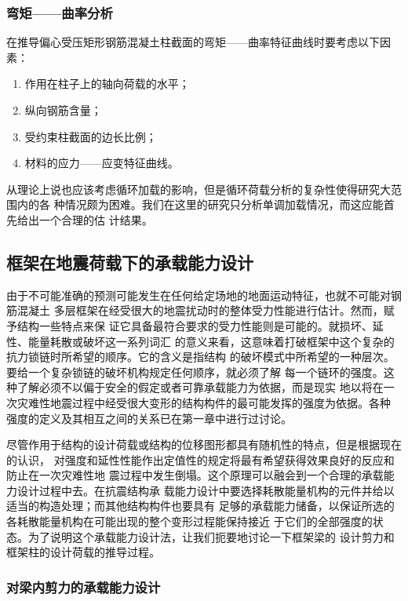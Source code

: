 \documentclass[12pt,a4paper]{book}
\begin{document}
\subsubsection{弯矩——曲率分析}

在推导偏心受压矩形钢筋混凝土柱截面的弯矩——曲率特征曲线时要考虑以下因素：
\begin{enumerate}
\item 作用在柱子上的轴向荷载的水平；
\item 纵向钢筋含量；
\item 受约束柱截面的边长比例；
\item 材料的应力——应变特征曲线。
\end{enumerate}

从理论上说也应该考虑循环加载的影响，但是循环荷载分析的复杂性使得研究大范围内的各
种情况颇为困难。我们在这里的研究只分析单调加载情况，而这应能首先给出一个合理的估
计结果。

\subsection{框架在地震荷载下的承载能力设计}

由于不可能准确的预测可能发生在任何给定场地的地面运动特征，也就不可能对钢筋混凝土
多层框架在经受很大的地震扰动时的整体受力性能进行估计。然而，赋予结构一些特点来保
证它具备最符合要求的受力性能则是可能的。就损坏、延性、能量耗散或破坏这一系列词汇
的意义来看，这意味着打破框架中这个复杂的抗力锁链时所希望的顺序。它的含义是指结构
的破坏模式中所希望的一种层次。要给一个复杂锁链的破坏机构规定任何顺序，就必须了解
每一个链环的强度。这种了解必须不以偏于安全的假定或者可靠承载能力为依据，而是现实
地以将在一次灾难性地震过程中经受很大变形的结构构件的最可能发挥的强度为依据。各种
强度的定义及其相互之间的关系已在第一章中进行过讨论。

尽管作用于结构的设计荷载或结构的位移图形都具有随机性的特点，但是根据现在的认识，
对强度和延性性能作出定值性的规定将最有希望获得效果良好的反应和防止在一次灾难性地
震过程中发生倒塌。这个原理可以融会到一个合理的承载能力设计过程中去。在抗震结构承
载能力设计中要选择耗散能量机构的元件并给以适当的构造处理；而其他结构构件也要具有
足够的承载能力储备，以保证所选的各耗散能量机构在可能出现的整个变形过程能保持接近
于它们的全部强度的状态。为了说明这个承载能力设计法，让我们扼要地讨论一下框架梁的
设计剪力和框架柱的设计荷载的推导过程。

\subsubsection{对梁内剪力的承载能力设计}
\end{document}
